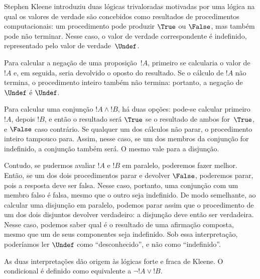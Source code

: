 \documentclass[../../../include/open-logic-section]{subfiles}
\begin{document}


Stephen Kleene introduziu duas lógicas trivaloradas motivadas por uma lógica
na qual os valores de verdade são concebidos como resultados de procedimentos
computacionais: um procedimento pode produzir $\True$ ou $\False$, mas também pode
não terminar. Nesse caso, o valor de verdade correspondente é
indefinido, representado pelo valor de verdade~$\Undef$.

Para calcular a negação de uma proposição~$!A$, primeiro se calcularia
o valor de~$!A$ e, em seguida, seria devolvido o oposto do resultado. Se o
cálculo de $!A$ não termina, o procedimento inteiro também não
termina: portanto, a negação de $\Undef$ é $\Undef$.

Para calcular uma conjunção $!A \land !B$, há duas opções: pode-se
calcular primeiro~$!A$, depois $!B$, e então o resultado será $\True$ se
o resultado de ambos for~$\True$, e $\False$ caso contrário. Se qualquer um dos
cálculos não parar, o procedimento inteiro tampouco para. Assim,
nesse caso, se um dos membros da conjunção for indefinido, a conjunção também será.
O mesmo vale para a disjunção.

Contudo, se pudermos avaliar $!A$ e $!B$ em paralelo, poderemos fazer melhor.
Então, se um dos dois procedimentos parar e devolver $\False$, poderemos
parar, pois a resposta deve ser falsa. Nesse caso, portanto, uma conjunção com
um membro falso é falsa, mesmo que o outro seja indefinido.
De modo semelhante, ao calcular uma disjunção em paralelo, podemos parar assim que
o procedimento de um dos dois disjuntos devolver verdadeiro: a
disjunção deve então ser verdadeira. Nesse caso, podemos saber qual é o resultado
de uma afirmação composta, mesmo que um de seus componentes seja indefinido. Sob
essa interpretação, poderíamos ler $\Undef$ como ``desconhecido'', e não como
``indefinido''.

As duas interpretações dão origem às lógicas forte e fraca de Kleene.
O condicional é definido como equivalente a $\lnot !A \lor !B$.
\end{document}
